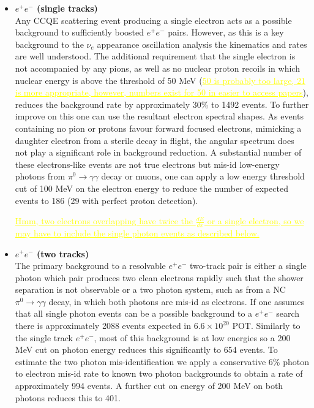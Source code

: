 \documentclass[11pt, a4paper]{article}
\newcommand{\newtext}[2]{\textcolor{#1}{\ul{#2}}}
\begin{document}
\begin{itemize}
\item  {\bf $e^+ e^-$ (single tracks)} \\
	Any CCQE scattering event producing a single electron acts as a possible background to sufficiently boosted $e^+e^-$ pairs. However, as this is a key background to the $\nu_e$ appearance oscillation analysis the kinematics and rates are well understood. The additional requirement that the single electron is not accompanied by any pions, as well as no nuclear proton recoils in which nuclear energy is above the threshold of 50 MeV (\newtext{MARK}{50 is probably too  large, 21 is more appropriate, however, numbers exist for 50 in easier to access papers}), reduces the background rate by approximately 30\% to 1492 events. To further improve on this one can use the resultant electron spectral shapes. As events containing no pion or protons favour forward focused electrons, mimicking a daughter electron from a sterile decay in flight, the angular spectrum does not play a significant role in background reduction. A substantial number of these electrons-like events are not true electrons but mis-id low-energy photons from $\pi^0 \rightarrow \gamma \gamma$ decay or muons, one can apply a low energy threshold cut of 100 MeV on the electron energy to reduce the number of expected events to 186 (29 with perfect proton detection). %

\newtext{MARK}{Hmm, two electrons overlapping have twice the $\frac{dE}{dx}$ or a single electron, so we may have to include the single photon events as described below.}

\item {\bf $e^+ e^-$ (two tracks)} \\
The primary background to a resolvable $e^+ e^-$ two-track pair is either a single photon which pair produces two clean electrons rapidly such that the shower separation is not observable or a two photon system, such as from a NC $\pi^0 \rightarrow \gamma \gamma$ decay, in which both photons are mis-id as electrons. If one assumes that all single photon events can be a possible background to a $e^+ e^-$ search there is approximately 2088 events expected in $6.6\times10^{20}$ POT. Similarly to the single track $e^+ e^-$, most of this background is at low energies so a 200 MeV cut on photon energy reduces this significantly to 654 events. To estimate the two photon mis-identification we apply a conservative 6\% photon to electron mis-id rate to known two photon backgrounds to obtain a rate of approximately 994 events. A further cut on  energy of 200 MeV on both photons reduces this to 401. 


\end{itemize}
\end{document}
